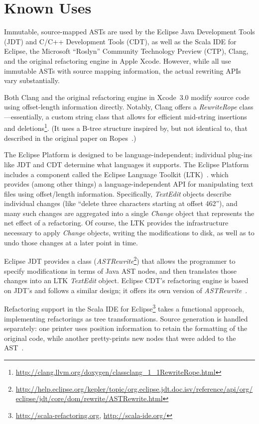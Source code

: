 \documentclass[prodmode]{acmlarge}
\begin{document}
\section{Known Uses}

Immutable, source-mapped ASTs are used by the Eclipse Java Development Tools
(JDT) and C/C++ Development Tools (CDT), as well as the Scala IDE for Eclipse,
the Microsoft ``Roslyn'' Community Technology Preview (CTP), Clang, and the
original refactoring engine in Apple Xcode.  However, while all use immutable
ASTs with source mapping information, the actual rewriting APIs vary
substantially.  

Both Clang and the original refactoring engine in Xcode~3.0 modify source code
using offset-length information directly.  Notably, Clang offers a
\textit{RewriteRope} class---essentially, a custom string class that allows for
efficient mid-string insertions and
deletions\footnote{\url{http://clang.llvm.org/doxygen/classclang_1_1RewriteRope.html}}.
(It uses a B-tree structure inspired by, but not identical to, that described
in the original paper on Ropes~\cite{boehm95ropes}.)
 
The Eclipse Platform is designed to be language-independent; individual
plug-ins like JDT and CDT determine what languages it supports.  The Eclipse
Platform includes a component called the Eclipse Language Toolkit
(LTK)~\cite{ltk}.  which provides (among other things) a language-independent
API for manipulating text files using offset/length information.  Specifically,
\textit{TextEdit} objects describe individual changes (like ``delete three
characters starting at offset 462''), and many such changes are aggregated into
a single \textit{Change} object that represents the net effect of a
refactoring.  Of course, the LTK provides the infrastructure necessary to apply
\textit{Change} objects, writing the modifications to disk, as well as to undo
those changes at a later point in time.

Eclipse JDT provides a class (\textit{ASTRewrite}\footnote{\url{http://help.eclipse.org/kepler/topic/org.eclipse.jdt.doc.isv/reference/api/org/eclipse/jdt/core/dom/rewrite/ASTRewrite.html}}) that allows the programmer
to specify modifications in terms of Java AST nodes, and then translates those
changes into an LTK \textit{TextEdit} object.  Eclipse CDT's refactoring engine
is based on JDT's and follows a similar design; it offers its own version of
\textit{ASTRewrite}~\cite{cdt-refactoring}.

Refactoring support in the Scala IDE for
Eclipse\footnote{\url{http://scala-refactoring.org},
\url{http://scala-ide.org/}} takes a functional approach, implementing
refactorings as tree transformations.  Source generation is handled separately:
one printer uses position information to retain the formatting of the original
code, while another pretty-prints new nodes that were added to the
AST~\cite{stocker10scala}.
\end{document}
